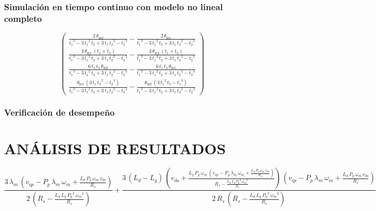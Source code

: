 \documentclass[a4paper, 10pt, onecolumn,journal]{ieeeconf}
\begin{document}
\subsubsection{\textbf{Simulación en tiempo continuo con modelo no lineal completo}}
\begin{equation}
	\left(\begin{array}{c} \frac{2\,\theta _{\mathrm{m2}}}{{t_{1}}^3-3\,{t_{1}}^2\,t_{2}+3\,t_{1}\,{t_{2}}^2-{t_{2}}^3}-\frac{2\,\theta _{\mathrm{m1}}}{{t_{1}}^3-3\,{t_{1}}^2\,t_{2}+3\,t_{1}\,{t_{2}}^2-{t_{2}}^3}\\ \frac{3\,\theta _{\mathrm{m1}}\,\left(t_{1}+t_{2}\right)}{{t_{1}}^3-3\,{t_{1}}^2\,t_{2}+3\,t_{1}\,{t_{2}}^2-{t_{2}}^3}-\frac{3\,\theta _{\mathrm{m2}}\,\left(t_{1}+t_{2}\right)}{{t_{1}}^3-3\,{t_{1}}^2\,t_{2}+3\,t_{1}\,{t_{2}}^2-{t_{2}}^3}\\ \frac{6\,t_{1}\,t_{2}\,\theta _{\mathrm{m2}}}{{t_{1}}^3-3\,{t_{1}}^2\,t_{2}+3\,t_{1}\,{t_{2}}^2-{t_{2}}^3}-\frac{6\,t_{1}\,t_{2}\,\theta _{\mathrm{m1}}}{{t_{1}}^3-3\,{t_{1}}^2\,t_{2}+3\,t_{1}\,{t_{2}}^2-{t_{2}}^3}\\ \frac{\theta _{\mathrm{m1}}\,\left(3\,t_{1}\,{t_{2}}^2-{t_{2}}^3\right)}{{t_{1}}^3-3\,{t_{1}}^2\,t_{2}+3\,t_{1}\,{t_{2}}^2-{t_{2}}^3}-\frac{\theta _{\mathrm{m2}}\,\left(3\,{t_{1}}^2\,t_{2}-{t_{1}}^3\right)}{{t_{1}}^3-3\,{t_{1}}^2\,t_{2}+3\,t_{1}\,{t_{2}}^2-{t_{2}}^3} \end{array}\right)
\end{equation}
\subsubsection{\textbf{Verificación de desempeño}}
\section{ANÁLISIS DE RESULTADOS}

\begin{equation}
	\frac{3\,\lambda _{m}\,\left(v_{\mathrm{qs}}-P_{p}\,\lambda _{m}\,\omega _{m}+\frac{L_{d}\,P_{p}\,\omega _{m}\,v_{\mathrm{ds}}}{R_{s}}\right)}{2\,\left(R_{s}-\frac{L_{d}\,L_{q}\,{P_{p}}^2\,{\omega _{m}}^2}{R_{s}}\right)}+\frac{3\,\left(L_{d}-L_{q}\right)\,\left(v_{\mathrm{ds}}+\frac{L_{q}\,P_{p}\,\omega _{m}\,\left(v_{\mathrm{qs}}-P_{p}\,\lambda _{m}\,\omega _{m}+\frac{L_{d}\,P_{p}\,\omega _{m}\,v_{\mathrm{ds}}}{R_{s}}\right)}{R_{s}-\frac{L_{d}\,L_{q}\,{P_{p}}^2\,{\omega _{m}}^2}{R_{s}}}\right)\,\left(v_{\mathrm{qs}}-P_{p}\,\lambda _{m}\,\omega _{m}+\frac{L_{d}\,P_{p}\,\omega _{m}\,v_{\mathrm{ds}}}{R_{s}}\right)}{2\,R_{s}\,\left(R_{s}-\frac{L_{d}\,L_{q}\,{P_{p}}^2\,{\omega _{m}}^2}{R_{s}}\right)}
\end{equation}
\end{document}
